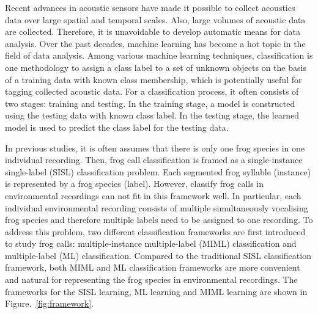Recent advances in acoustic sensors have made it possible to collect acoustics data over large spatial and temporal scales. Also, large volumes of acoustic data are collected. Therefore, it is unavoidable to develop automatic means for data analysis. Over the past decades, machine learning has become a hot topic in the field of data analysis. Among various machine learning techniques, classification is one methodology to assign a class label to a set of unknown objects on the basis of a training data with known class membership, which is potentially useful for tagging collected acoustic data. For a classification process, it often consists of two stages: training and testing. In the training stage, a model is constructed using the testing data with known class label. In the testing stage, the learned model is used to predict the class label for the testing data. 

In previous studies, it is often assumes that there is only one frog species in one individual recording. Then, frog call classification is framed as a single-instance single-label (SISL) classification problem. Each segmented frog syllable (instance) is represented by a frog species (label). 
However, classify frog calls in environmental recordings can not fit in this framework well. In particular, each individual environmental recording consists of multiple simultaneously vocalising frog species and therefore multiple labels need to be assigned to one recording. To address this problem, two different classification frameworks are first introduced to study frog calls: multiple-instance multiple-label (MIML) classification and multiple-label (ML) classification. Compared to the traditional SISL classification framework, both MIML and ML classification frameworks are more convenient and natural for representing the frog species in environmental recordings. The frameworks for the SISL learning, ML learning and MIML learning are shown in Figure.~\ref{fig:framework}.



